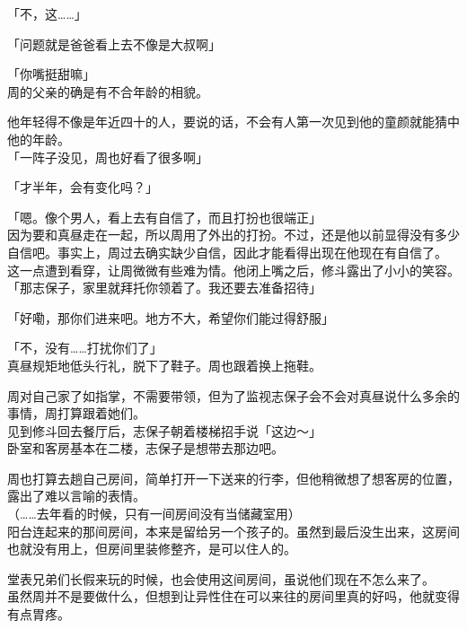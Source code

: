 「不，这……」

「问题就是爸爸看上去不像是大叔啊」

「你嘴挺甜嘛」\\

周的父亲的确是有不合年龄的相貌。

他年轻得不像是年近四十的人，要说的话，不会有人第一次见到他的童颜就能猜中他的年龄。\\

「一阵子没见，周也好看了很多啊」

「才半年，会有变化吗？」

「嗯。像个男人，看上去有自信了，而且打扮也很端正」\\

因为要和真昼走在一起，所以周用了外出的打扮。不过，还是他以前显得没有多少自信吧。事实上，周过去确实缺少自信，因此才能看得出现在他现在有自信了。\\

这一点遭到看穿，让周微微有些难为情。他闭上嘴之后，修斗露出了小小的笑容。\\

「那志保子，家里就拜托你领着了。我还要去准备招待」

「好嘞，那你们进来吧。地方不大，希望你们能过得舒服」

「不，没有……打扰你们了」\\

真昼规矩地低头行礼，脱下了鞋子。周也跟着换上拖鞋。

周对自己家了如指掌，不需要带领，但为了监视志保子会不会对真昼说什么多余的事情，周打算跟着她们。\\

见到修斗回去餐厅后，志保子朝着楼梯招手说「这边～」\\

卧室和客房基本在二楼，志保子是想带去那边吧。

周也打算去趟自己房间，简单打开一下送来的行李，但他稍微想了想客房的位置，露出了难以言喻的表情。\\

（……去年看的时候，只有一间房间没有当储藏室用）\\

阳台连起来的那间房间，本来是留给另一个孩子的。虽然到最后没生出来，这房间也就没有用上，但房间里装修整齐，是可以住人的。

堂表兄弟们长假来玩的时候，也会使用这间房间，虽说他们现在不怎么来了。\\

虽然周并不是要做什么，但想到让异性住在可以来往的房间里真的好吗，他就变得有点胃疼。\\

